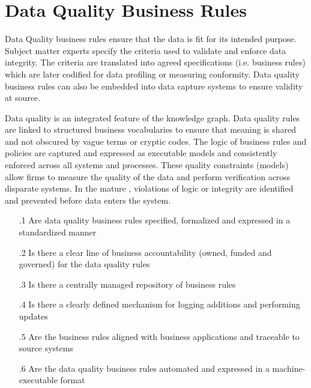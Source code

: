 \section{Data Quality Business Rules}\label{sec:ekgmm-b-3-2} %

Data Quality business rules ensure that the data is fit for its intended purpose.
Subject matter experts specify the criteria used to validate and enforce data integrity.
The criteria are translated into agreed specifications (i.e. business rules) which are later codified for data profiling or measuring conformity.
Data quality business rules can also be embedded into data capture systems to ensure validity at source.

\kgmmekgrationalesection

Data quality is an integrated feature of the knowledge graph.
Data quality rules are linked to structured business vocabularies to ensure that meaning is shared and not obscured by vague terms or cryptic codes.
The logic of business rules and policies are captured and expressed as executable models and consistently enforced across all systems and processes.
These quality constraints (models) allow firms to measure the quality of the data and perform verification across disparate systems.
In the mature , violations of logic or integrity are identified and prevented before data enters the system.

\kgmmcorequestionssection

\begin{itemize}[leftmargin=.5in]

  \item [\thesection.1] Are data quality business rules specified, formalized and expressed in a standardized manner
  \item [\thesection.2] Is there a clear line of business accountability (owned, funded and governed) for the data quality rules
  \item [\thesection.3] Is there a centrally managed repository of business rules
  \item [\thesection.4] Is there a clearly defined mechanism for logging additions and performing updates
  \item [\thesection.5] Are the business rules aligned with business applications and traceable to source systems
  \item [\thesection.6] Are the data quality business rules automated and expressed in a machine-executable format

\end{itemize}
